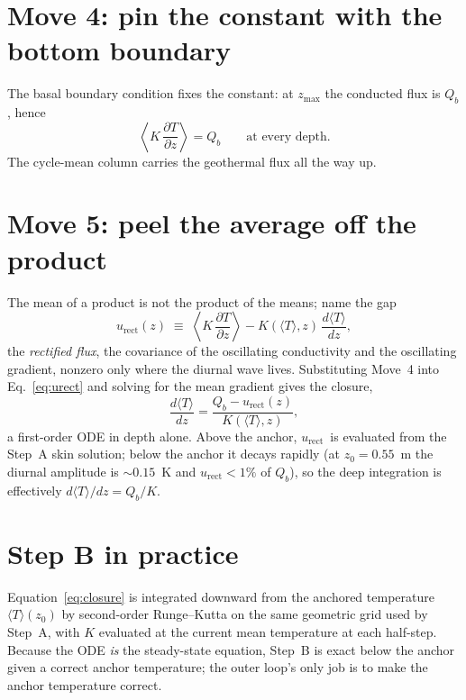 \documentclass[11pt,a4paper,oneside]{report}
\newcommand{\Qb}{\ensuremath{Q_b}}
\newcommand{\Tm}{\ensuremath{\langle T\rangle}}
\newcommand{\urect}{\ensuremath{u_{\mathrm{rect}}}}
\begin{document}
\section*{Move 4: pin the constant with the bottom boundary}
The basal boundary condition fixes the constant: at $z_{\max}$ the
conducted flux is \Qb, hence
\begin{equation}
  \left\langle K\,\frac{\partial T}{\partial z}\right\rangle = \Qb
  \qquad\text{at every depth.}
\end{equation}
The cycle-mean column carries the geothermal flux all the way up.

\section*{Move 5: peel the average off the product}
The mean of a product is not the product of the means; name the gap
\begin{equation}
  \urect(z) \;\equiv\;
  \left\langle K\,\frac{\partial T}{\partial z}\right\rangle
  - K(\Tm, z)\,\frac{d\Tm}{dz},
  \label{eq:urect}
\end{equation}
the \emph{rectified flux}, the covariance of the oscillating
conductivity and the oscillating gradient, nonzero only where the
diurnal wave lives. Substituting Move~4 into Eq.~\eqref{eq:urect} and
solving for the mean gradient gives the closure,
\begin{equation}
  \frac{d\Tm}{dz} = \frac{\Qb - \urect(z)}{K(\Tm, z)},
\end{equation}
a first-order ODE in depth alone. Above the anchor, \urect\ is
evaluated from the Step~A skin solution; below the anchor it decays
rapidly (at $z_0=0.55$~m the diurnal amplitude is ${\sim}0.15$~K and
$\urect<1\%$ of \Qb), so the deep integration is effectively
$d\Tm/dz=\Qb/K$.

\section*{Step B in practice}
Equation~\eqref{eq:closure} is integrated downward from the anchored
temperature $\Tm(z_0)$ by second-order Runge--Kutta on the same
geometric grid used by Step~A, with $K$ evaluated at the current mean
temperature at each half-step. Because the ODE \emph{is} the
steady-state equation, Step~B is exact below the anchor given a
correct anchor temperature; the outer loop's only job is to make the
anchor temperature correct.

\end{document}
